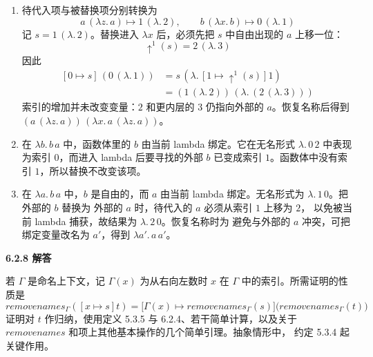\begin{taplauthorsolutionentrybox}
{\begin{enumerate}
  \item 待代入项与被替换项分别转换为
    \[
      a\,(\lambda z.\,a)\longmapsto1\,(\lambda.\,2),
      \qquad
      b\,(\lambda x.\,b)\longmapsto0\,(\lambda.\,1)
    \]
    记 \(s=1\,(\lambda.\,2)\)。替换进入 \(\lambda x\) 后，必须先把
    \(s\) 中自由出现的 \(a\) 上移一位：
    \[
      \uparrow^1(s)=2\,(\lambda.\,3)
    \]
    因此
    \[
    \begin{aligned}
    [0\mapsto s]\,(0\,(\lambda.\,1))
      &=s\,(\lambda.\,[1\mapsto\uparrow^1(s)]1)\\
      &=(1\,(\lambda.\,2))\,
        (\lambda.\,(2\,(\lambda.\,3)))
    \end{aligned}
    \]
    索引的增加并未改变变量：\(2\) 和更内层的 \(3\) 仍指向外部的
    \(a\)。恢复名称后得到
    \((a\,(\lambda z.\,a))\,
      (\lambda x.\,a\,(\lambda z.\,a))\)。

  \item 在 \(\lambda b.\,b\,a\) 中，函数体里的 \(b\) 由当前 lambda
    绑定。它在无名形式 \(\lambda.\,0\,2\) 中表现为索引 \(0\)，而进入
    lambda 后要寻找的外部 \(b\) 已变成索引 \(1\)。函数体中没有索引
    \(1\)，所以替换不改变该项。

  \item 在 \(\lambda a.\,b\,a\) 中，\(b\) 是自由的，而 \(a\) 由当前
    lambda 绑定。无名形式为 \(\lambda.\,1\,0\)。把外部的 \(b\) 替换为
    外部的 \(a\) 时，待代入的 \(a\) 必须从索引 \(1\) 上移为 \(2\)，
    以免被当前 lambda 捕获，故结果为 \(\lambda.\,2\,0\)。恢复名称时为
    避免与外部的 \(a\) 冲突，可把绑定变量改名为 \(a'\)，得到
    \(\lambda a'.\,a\,a'\)。
\end{enumerate}}

\end{taplauthorsolutionentrybox}

\begin{taplauthorsolutionentrybox}
\label{sol:author:6.2.8}
\textbf{6.2.8 解答}

若 \(\Gamma\) 是命名上下文，记 \(\Gamma(x)\) 为从右向左数时 \(x\)
在 \(\Gamma\) 中的索引。所需证明的性质是
\[
\mathit{removenames}_{\Gamma}([x\mapsto s]t)
=
\bigl[\Gamma(x)\mapsto\mathit{removenames}_{\Gamma}(s)\bigr]
\bigl(\mathit{removenames}_{\Gamma}(t)\bigr)
\]
证明对 \(t\) 作归纳，使用定义 5.3.5 与 6.2.4、若干简单计算，以及关于
\(\mathit{removenames}\) 和项上其他基本操作的几个简单引理。抽象情形中，
约定 5.3.4 起关键作用。

\end{taplauthorsolutionentrybox}

